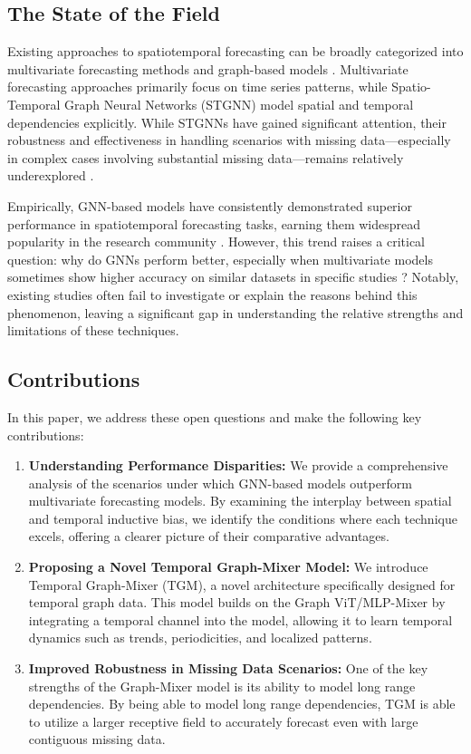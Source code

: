 \documentclass{article}
\theoremstyle{plain}
\theoremstyle{definition}
\theoremstyle{remark}
\begin{document}
\subsection{The State of the Field}
Existing approaches to spatiotemporal forecasting can be broadly categorized into multivariate forecasting methods and graph-based models \cite{longa2023graph}. Multivariate forecasting approaches primarily focus on time series patterns, while Spatio-Temporal Graph Neural Networks (STGNN) model spatial and temporal dependencies explicitly. While STGNNs have gained significant attention, their robustness and effectiveness in handling scenarios with missing data—especially in complex cases involving substantial missing data—remains relatively underexplored \cite{marisca2024graph}.

Empirically, GNN-based models have consistently demonstrated superior performance in spatiotemporal forecasting tasks, earning them widespread popularity in the research community \cite{longa2023graph}. However, this trend raises a critical question: why do GNNs perform better, especially when multivariate models sometimes show higher accuracy on similar datasets in specific studies \cite{rnnSurvey, luo2024lsttn, wang2024mixturemodel, cai2020traffictransformer, liu2023vanillatransformer}? Notably, existing studies often fail to investigate or explain the reasons behind this phenomenon, leaving a significant gap in understanding the relative strengths and limitations of these techniques.

\subsection{Contributions}
In this paper, we address these open questions and make the following key contributions:

\begin{enumerate}
    \item \textbf{Understanding Performance Disparities:}
    We provide a comprehensive analysis of the scenarios under which GNN-based models outperform multivariate forecasting models. By examining the interplay between spatial and temporal inductive bias, we identify the conditions where each technique excels, offering a clearer picture of their comparative advantages.
    \item \textbf{Proposing a Novel Temporal Graph-Mixer Model:}
    We introduce Temporal Graph-Mixer (TGM), a novel architecture specifically designed for temporal graph data. This model builds on the Graph ViT/MLP-Mixer \cite{he2023generalization} by integrating a temporal
channel into the model, allowing it to learn temporal dynamics such as trends, periodicities, and localized patterns.
    \item \textbf{Improved Robustness in Missing Data Scenarios:}
    One of the key strengths of the Graph-Mixer model is its ability to model long range dependencies. By being able to model long range dependencies, TGM is able to utilize a larger receptive field to accurately forecast even with large contiguous missing data.  
\end{enumerate}
\end{document}
